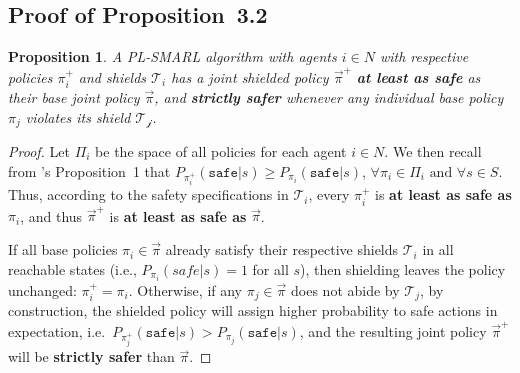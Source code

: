 \documentclass{ecai}
\theoremstyle{plain}
\newtheorem{proposition}[theorem]{Proposition}
\theoremstyle{definition}
\theoremstyle{remark}
\begin{document}
\subsection{Proof of Proposition~3.2} \label{app:safety}
\begin{proposition}
    A PL-SMARL algorithm with agents $i\in N$ with respective policies $\pi_i^+$ and shields $\mathcal{T}_i$ has a joint shielded policy $\vec\pi^+$ \textbf{at least as safe} as their base joint policy $\vec\pi$, and \textbf{strictly safer} whenever any individual base policy $\pi_j$ violates its shield $\mathcal{T_j}$.
\end{proposition}
\begin{proof}
    Let $\Pi_i$ be the space of all policies for each agent $i\in N$. We then recall from \citet{yang2023safe}'s Proposition~1 that $P_{\pi^+_i}(\texttt{safe} | s) \geq P_{\pi_i}(\texttt{safe} | s)$, $\forall \pi_i \in \Pi_i \text{ and } \forall s \in S$. Thus, according to the safety specifications in $\mathcal{T}_i$, every $\pi_i^+$ is \textbf{at least as safe as} $\pi_i$, and thus $\vec{\pi}^+$ is \textbf{at least as safe as} $\vec{\pi}$. 
    
    If all base policies $\pi_i\in\vec{\pi}$ already satisfy their respective shields $\mathcal{T}_i$ in all reachable states (i.e., $P_{\pi_i}(safe | s) = 1$ for all $s$), then shielding leaves the policy unchanged: $\pi_i^+ = \pi_i$. Otherwise, if any $\pi_j\in\vec{\pi}$ does not abide by $\mathcal{T}_j$, by construction, the shielded policy will assign higher probability to safe actions in expectation, i.e.\ $P_{\pi^+_j}(\texttt{safe} | s) > P_{\pi_j}(\texttt{safe} | s)$, and the resulting joint policy $\vec{\pi}^+$ will be \textbf{strictly safer} than $\vec{\pi}$.
\end{proof}



\end{document}
